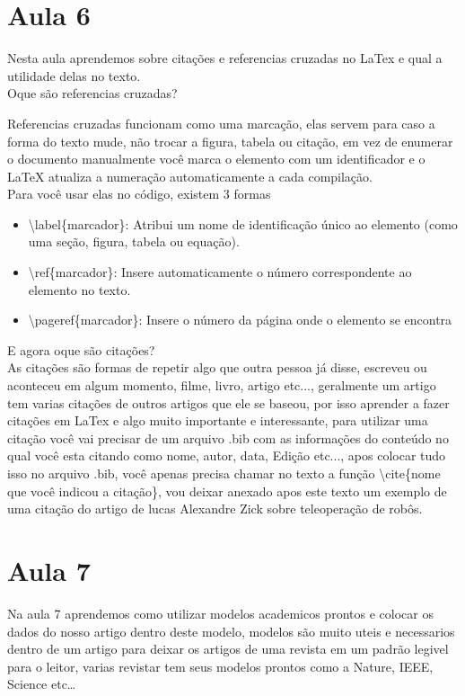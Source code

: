 \section{Aula 6}
Nesta aula aprendemos sobre citações e referencias cruzadas no LaTex e qual a utilidade delas no texto.
\\Oque são referencias cruzadas?


Referencias cruzadas funcionam como uma marcação, elas servem para caso a forma do texto mude, não trocar a figura, tabela ou citação, em vez de enumerar o documento manualmente você marca o elemento com um identificador e o LaTeX atualiza a numeração automaticamente a cada compilação.
\\Para você usar elas no código, existem 3 formas
\begin{itemize}
    \item \textbackslash label\{marcador\}: Atribui um nome de identificação único ao elemento (como uma seção, figura, tabela ou equação).
    \item \textbackslash ref\{marcador\}: Insere automaticamente o número correspondente ao elemento no texto.
    \item \textbackslash pageref\{marcador\}: Insere o número da página onde o elemento se encontra
\end{itemize}
E agora oque são citações?\\


As citações são formas de repetir algo que outra pessoa já disse, escreveu ou aconteceu em algum momento, filme, livro, artigo etc..., geralmente um artigo tem varias citações de outros artigos que ele se baseou, por isso aprender a fazer citações em LaTex e algo muito importante e interessante, para utilizar uma citação você vai precisar de um arquivo .bib com as informações do conteúdo no qual você esta citando como nome, autor, data, Edição etc..., apos colocar tudo isso no arquivo .bib, você apenas precisa chamar no texto a função \textbackslash cite\{nome que você indicou a citação\}, vou deixar anexado apos este texto um exemplo de uma citação do artigo de lucas Alexandre Zick sobre teleoperação de robôs.   
\cite{zickgames2024teleoperation}
\section{Aula 7}
Na aula 7 aprendemos como utilizar modelos academicos prontos e colocar os dados do nosso artigo dentro deste modelo, modelos são muito uteis e necessarios dentro de um artigo para deixar os artigos de uma revista em um padrão legivel para o leitor, varias revistar tem seus modelos prontos como a Nature, IEEE, Science etc\dots


